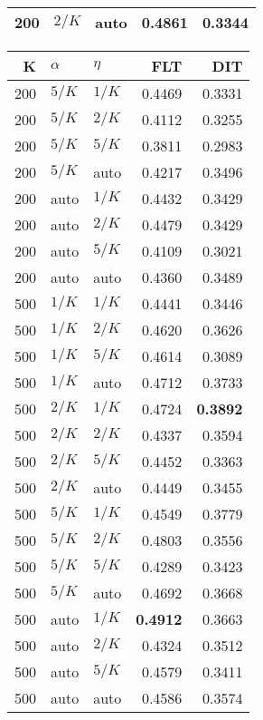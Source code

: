\begin{table}
\begin{spacing}{1.2}
{\begin{tabular}{rll|rr}
 200 &  $2/K$ &   auto &           0.4861 & 0.3344 \\
\bottomrule
\end{tabular}
} \hfill \parbox{.45\linewidth}{\centering \begin{tabular}{rll|rr}
\toprule
   K &  $\alpha$ &    $\eta$ & FLT &       DIT \\
\midrule
 200 &  $5/K$ &  $1/K$ &           0.4469 &       0.3331 \\
 200 &  $5/K$ &  $2/K$ &           0.4112 &       0.3255 \\
 200 &  $5/K$ &  $5/K$ &           0.3811 &       0.2983 \\
 200 &  $5/K$ &   auto &           0.4217 &       0.3496 \\
 200 &   auto &  $1/K$ &           0.4432 &       0.3429 \\
 200 &   auto &  $2/K$ &           0.4479 &       0.3429 \\
 200 &   auto &  $5/K$ &           0.4109 &       0.3021 \\
 200 &   auto &   auto &           0.4360 &       0.3489 \\
 500 &  $1/K$ &  $1/K$ &           0.4441 &       0.3446 \\
 500 &  $1/K$ &  $2/K$ &           0.4620 &       0.3626 \\
 500 &  $1/K$ &  $5/K$ &           0.4614 &       0.3089 \\
 500 &  $1/K$ &   auto &           0.4712 &       0.3733 \\
 500 &  $2/K$ &  $1/K$ &           0.4724 & {\bf 0.3892} \\
 500 &  $2/K$ &  $2/K$ &           0.4337 &       0.3594 \\
 500 &  $2/K$ &  $5/K$ &           0.4452 &       0.3363 \\
 500 &  $2/K$ &   auto &           0.4449 &       0.3455 \\
 500 &  $5/K$ &  $1/K$ &           0.4549 &       0.3779 \\
 500 &  $5/K$ &  $2/K$ &           0.4803 &       0.3556 \\
 500 &  $5/K$ &  $5/K$ &           0.4289 &       0.3423 \\
 500 &  $5/K$ &   auto &           0.4692 &       0.3668 \\
 500 &   auto &  $1/K$ &     {\bf 0.4912} &       0.3663 \\
 500 &   auto &  $2/K$ &           0.4324 &       0.3512 \\
 500 &   auto &  $5/K$ &           0.4579 &       0.3411 \\
 500 &   auto &   auto &           0.4586 &       0.3574 \\
\bottomrule
\end{tabular}
}
\end{spacing}
\end{table}
